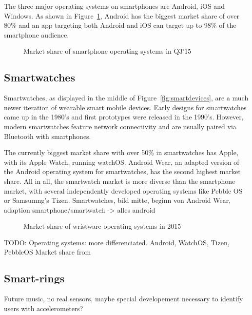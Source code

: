 The three major operating systems on smartphones are Android, iOS and Windows. As shown in Figure~\ref{fig:smartphoneosmarketshare}, Android has the biggest market share of over 80\% and an \gls{app} targeting both Android and iOS can target up to 98\% of the smartphone audience.

\begin{figure}
    \centering
    
    \caption{Market share of smartphone operating systems in Q3'15\cite{gartner2015smartosmarketshare}}
    \label{fig:smartphoneosmarketshare}
\end{figure}

\subsection{Smartwatches}
Smartwatches, as displayed in the middle of Figure~\ref{fig:smartdevices}, are a much newer iteration of wearable smart mobile devices. Early designs for smartwatches came up in the 1980's and first prototypes were released in the 1990's. However, modern smartwatches feature network connectivity and are usually paired via Bluetooth with smartphones.

The currently biggest market share with over 50\% in smartwatches has Apple, with its Apple Watch, running watchOS. Android Wear, an adapted version of the Android operating system for smartwatches, has the second highest market share. All in all, the smartwatch market is more diverse than the smartphone market, with several independently developed operating systems like Pebble OS or Samsumng's Tizen.
Smartwatches, bild mitte, beginn von Android Wear, adaption smartphone/smartwatch -> alles android

\begin{figure}
    \centering
    
    \caption{Market share of wristware operating systems in 2015\cite{idc2015wristmarketshare}}
    \label{fig:my_label}
\end{figure}

TODO: Operating systems: more differenciated. Android, WatchOS, Tizen, PebbleOS Market share from \cite{idc2015wristmarketshare}

\subsection{Smart-rings}
Future music, no real sensors, maybe special developement necessary to identify users with accelerometers?

